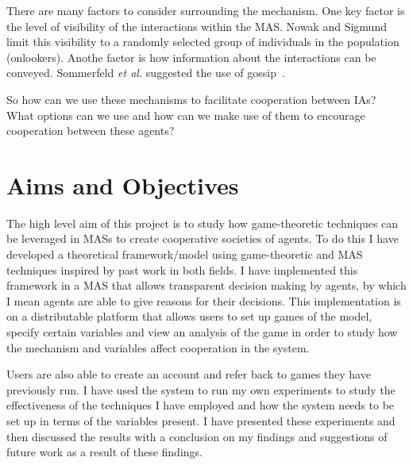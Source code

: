 \documentclass[]{final_report}
\begin{document}
There are many factors to consider surrounding the mechanism. One key factor is the level of visibility of the interactions within the MAS. Nowak and Sigmund~\cite{evol_indirect_image} limit this visibility to a randomly selected group of individuals in the population (onlookers). Anothe factor is how information about the interactions can be conveyed. Sommerfeld \textit{et al.} suggested the use of gossip~\cite{gossip_alt}.\par 
So how can we use these mechanisms to facilitate cooperation between IAs? What options can we use and how can we make use of them to encourage cooperation between these agents?

\section{Aims and Objectives}
\label{sec:aao}
The high level aim of this project is to study how game-theoretic techniques can be leveraged in MASs to create cooperative societies of agents. To do this I have developed a theoretical framework/model using game-theoretic and MAS techniques inspired by past work in both fields. I have implemented this framework in a MAS that allows transparent decision making by agents, by which I mean agents are able to give reasons for their decisions. This implementation is on a distributable platform that allows users to set up games of the model, specify certain variables and view an analysis of the game in order to study how the mechanism and variables affect cooperation in the system.\par
Users are also able to create an account and refer back to games they have previously run. I have used the system to run my own experiments to study the effectiveness of the techniques I have employed and how the system needs to be set up in terms of the variables present. I have presented these experiments and then discussed the results with a conclusion on my findings and suggestions of future work as a result of these findings.
\end{document}
